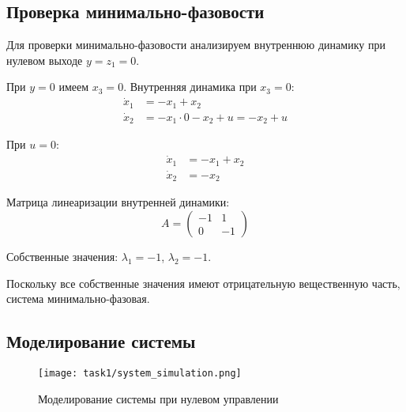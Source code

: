 \subsection*{Проверка минимально-фазовости}

Для проверки минимально-фазовости анализируем внутреннюю динамику при нулевом выходе $y = z_1 = 0$.

При $y = 0$ имеем $x_3 = 0$. Внутренняя динамика при $x_3 = 0$:
\begin{align}
\dot{x}_1 &= -x_1 + x_2 \\
\dot{x}_2 &= -x_1 \cdot 0 - x_2 + u = -x_2 + u
\end{align}

При $u = 0$:
\begin{align}
\dot{x}_1 &= -x_1 + x_2 \\
\dot{x}_2 &= -x_2
\end{align}

Матрица линеаризации внутренней динамики:
\begin{equation}
A = \begin{pmatrix} -1 & 1 \\ 0 & -1 \end{pmatrix}
\end{equation}

Собственные значения: $\lambda_1 = -1$, $\lambda_2 = -1$.

Поскольку все собственные значения имеют отрицательную вещественную часть, система минимально-фазовая.



\subsection*{Моделирование системы}

\begin{figure}[H]
\centering
\texttt{[image: task1/system\_simulation.png]}
\caption{Моделирование системы при нулевом управлении}
\label{fig:system_simulation}
\end{figure}

